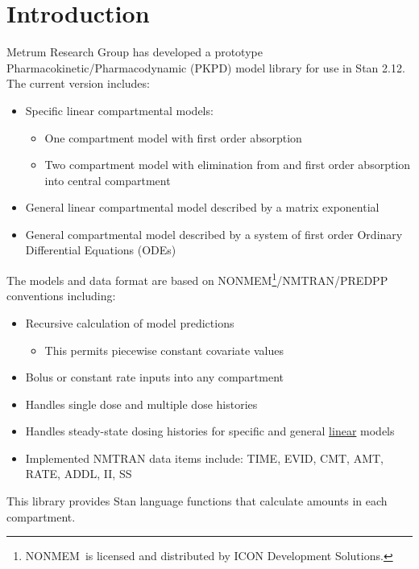 \documentclass[11pt]{amsart}
\let\oldsection\section
\renewcommand\section{\clearpage\oldsection}
\begin{document}
\section{Introduction}
Metrum Research Group has developed a prototype Pharmacokinetic/Pharmacodynamic (PKPD) model library for use in Stan 2.12. The current version includes:
\begin{itemize}
  \item Specific linear compartmental models:
  \begin{itemize}
    \item One compartment model with first order absorption
    \item Two compartment model with elimination from and first order absorption into central compartment
  \end{itemize}
  \item General linear compartmental model described by a matrix exponential
  \item General compartmental model described by a system of first order Ordinary Differential Equations (ODEs)
\end{itemize}

The models and data format are based on NONMEM\textregistered\footnote{NONMEM\textregistered\ is licensed and distributed by ICON Development Solutions.}/NMTRAN/PREDPP conventions including:
\begin{itemize}
  \item Recursive calculation of model predictions
  \begin{itemize}
    \item This permits piecewise constant covariate values
  \end{itemize}
  \item Bolus or constant rate inputs into any compartment
  \item Handles single dose and multiple dose histories
  \item Handles steady-state dosing histories for specific and general \underline{linear} models
  \item Implemented NMTRAN data items include: TIME, EVID, CMT, AMT, RATE, ADDL, II, SS
\end{itemize}
This library provides Stan language functions that calculate amounts in each compartment.
    
\end{document}

